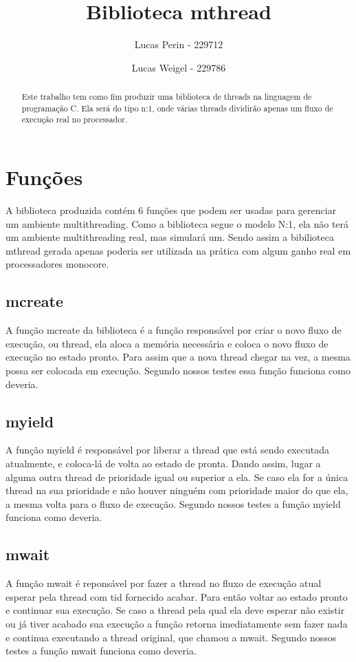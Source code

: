 \documentclass[12pt,a4paper]{report}
\author{Lucas Perin - 229712 \and Lucas Weigel - 229786}
\title{Biblioteca mthread}
\begin{document}
\maketitle
\tableofcontents

\begin{abstract}
	Este trabalho tem como fim produzir uma biblioteca de threads na linguagem de programação C. Ela será do tipo n:1, onde várias threads dividirão apenas um fluxo de execução real no processador.
\end{abstract}

\chapter{Funções}
	A biblioteca produzida contém 6 funções que podem ser usadas para gerenciar um ambiente multithreading. Como a biblioteca segue o modelo N:1, ela não terá um ambiente multithreading real, mas simulará um. Sendo assim a bibilioteca mthread gerada apenas poderia ser utilizada na prática com algum ganho real em processadores monocore.

\section{mcreate}
	A função mcreate da biblioteca é a função responsável por criar o novo fluxo de execução, ou thread, ela aloca a memória necessária e coloca o novo fluxo de execução no estado pronto. Para assim que a nova thread chegar na vez, a mesma possa ser colocada em execução. Segundo nossos testes essa função funciona como deveria.
	
\section{myield}
	A função myield é responsável por liberar a thread que está sendo executada atualmente, e coloca-lá de volta ao estado de pronta. Dando assim, lugar a alguma outra thread de prioridade igual ou superior a ela. Se caso ela for a única thread na sua prioridade e não houver ninguém com prioridade maior do que ela, a mesma volta para o fluxo de execução. Segundo nossos testes a função myield funciona como deveria.
	
\section{mwait}
	A função mwait é reponsável por fazer a thread no fluxo de execução atual esperar pela thread com tid fornecido acabar. Para então voltar ao estado pronto e continuar sua execução. Se caso a thread pela qual ela deve esperar não existir ou já tiver acabado sua execução a função retorna imediatamente sem fazer nada e continua executando a thread original, que chamou a mwait. Segundo nossos testes a função mwait funciona como deveria.
\end{document}
